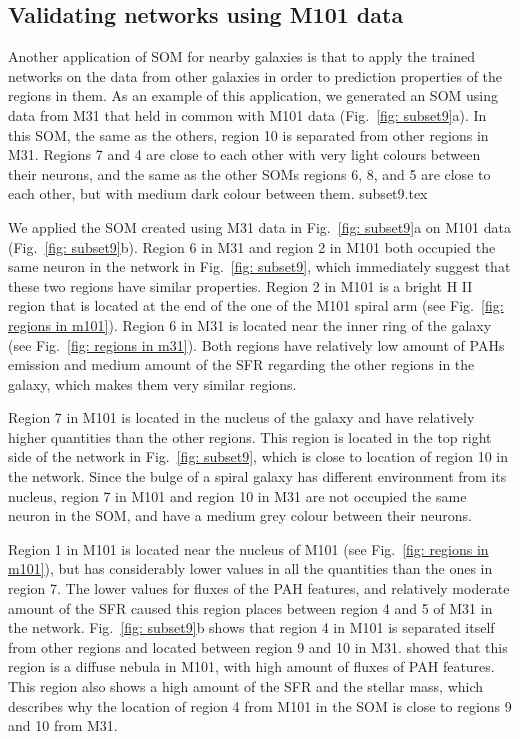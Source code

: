     \subsection{Validating networks using M101 data}
    Another application of SOM for nearby galaxies is that to apply the trained networks on the data from other galaxies in order to prediction properties of the regions in them. %
    As an example of this application, we generated an SOM using data from M31 that held in common with M101 data (Fig.~\ref{fig: subset9}a). 
    In this SOM, the same as the others, region 10 is separated from other regions in M31.
    Regions 7 and 4 are close to each other with very light colours between their neurons, and the same as the other SOMs regions 6, 8, and 5 are close to each other, but with medium dark colour between them.
    {subset9.tex}
    
    We applied the SOM created using M31 data in Fig.~\ref{fig: subset9}a on M101 data (Fig.~\ref{fig: subset9}b).
    Region 6 in M31 and region 2 in M101 both occupied the same neuron in the network in Fig.~\ref{fig: subset9}, which immediately suggest that these two regions have similar properties. 
    Region 2 in M101 is a bright H {\sc II} region that is located at the end of the one of the M101 spiral arm (see Fig.~\ref{fig: regions in m101}). 
    Region 6 in M31 is located near the inner ring of the galaxy (see Fig.~\ref{fig: regions in m31}).
    Both regions have relatively low amount of PAHs emission and medium amount of the SFR regarding the other regions in the galaxy, which makes them very similar regions.
    
    Region 7 in M101 is located in the nucleus of the galaxy and have relatively higher quantities than the other regions.
    This region is located in the top right side of the network in Fig.~\ref{fig: subset9}, which is close to location of region 10 in the network.
    Since the bulge of a spiral galaxy has different environment from its nucleus, region 7 in M101 and region 10 in M31 are not occupied the same neuron in the SOM, and have a medium grey colour between their neurons.

    Region 1 in M101 is located near the nucleus of M101 (see Fig.~\ref{fig: regions in m101}), but has considerably lower values in all the quantities than the ones in region 7.
    The lower values for fluxes of the PAH features, and relatively moderate amount of the SFR caused this region places between region 4 and 5 of M31 in the network. 
    Fig.~\ref{fig: subset9}b shows that region 4 in M101 is separated itself from other regions and located between region 9 and 10 in M31.
    \cite{Gordon08} showed that this region is a diffuse nebula in M101, with high amount of fluxes of PAH features. 
    This region also shows a high amount of the SFR and the stellar mass, which describes why the location of region 4 from M101 in the SOM is close to regions 9 and 10 from M31.
    
